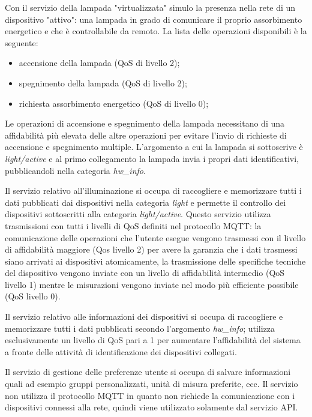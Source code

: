 Con il servizio della lampada "virtualizzata" simulo la presenza nella rete di un dispositivo "attivo": una lampada in grado di comunicare il proprio assorbimento energetico e che è controllabile da remoto.
La lista delle operazioni disponibili è la seguente:
\begin{itemize}
	\item accensione della lampada (QoS di livello 2);
	\item spegnimento della lampada (QoS di livello 2);
	\item richiesta assorbimento energetico (QoS di livello 0);
\end{itemize}
Le operazioni di accensione e spegnimento della lampada necessitano di una affidabilità più elevata delle altre operazioni per evitare l'invio di richieste di accensione e spegnimento multiple.
L'argomento a cui la lampada si sottoscrive è \emph{light/active} e al primo collegamento la lampada invia i propri dati identificativi, pubblicandoli nella categoria \emph{hw\_info}.

Il servizio relativo all'illuminazione si occupa di raccogliere e memorizzare tutti i dati pubblicati dai dispositivi nella categoria \emph{light} e permette il controllo dei dispositivi sottoscritti alla categoria \emph{light/active}.
Questo servizio utilizza trasmissioni con tutti i livelli di QoS definiti nel protocollo MQTT: la comunicazione delle operazioni che l'utente esegue vengono trasmessi con il livello di affidabilità maggiore (Qos livello 2) per avere la garanzia che i dati trasmessi siano arrivati ai dispositivi atomicamente, la trasmissione delle specifiche tecniche del dispositivo vengono inviate con un livello di affidabilità intermedio (QoS livello 1) mentre le misurazioni vengono inviate nel modo più efficiente possibile (QoS livello 0).

Il servizio relativo alle informazioni dei dispositivi si occupa di raccogliere e memorizzare tutti i dati pubblicati secondo l'argomento \emph{hw\_info}; utilizza esclusivamente un livello di QoS pari a 1 per aumentare l'affidabilità del sistema a fronte delle attività di identificazione dei dispositivi collegati.

Il servizio di gestione delle preferenze utente si occupa di salvare informazioni quali ad esempio gruppi personalizzati, unità di misura preferite, ecc.
Il servizio non utilizza il protocollo MQTT in quanto non richiede la comunicazione con i dispositivi connessi alla rete, quindi viene utilizzato solamente dal servizio API.

